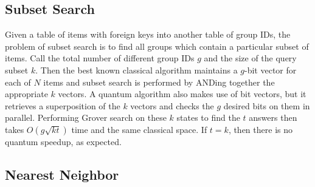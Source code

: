 \documentclass{toc}
\theoremstyle{plain}
\theoremstyle{definition}
\begin{document}

\subsection{Subset Search}

Given a table of items with foreign keys into another table of group IDs,
the problem of subset search is to find all groups which contain a
particular subset of items. Call the total number of different group IDs
$g$ and the size of the query subset
$k$. Then the best known classical algorithm maintains a $g$-bit vector
for each of $N$ items and subset search is performed by ANDing together the
appropriate $k$ vectors.
A quantum algorithm also makes use of bit vectors, but it retrieves a
superposition of the $k$ vectors and checks the $g$ desired bits on
them in parallel. Performing Grover search on these $k$ states to find
the $t$ answers then takes $O(g\sqrt{kt})$ time and the same classical
space. If $t=k$, then there is no quantum speedup, as expected.

\subsection{Nearest Neighbor}
\end{document}

